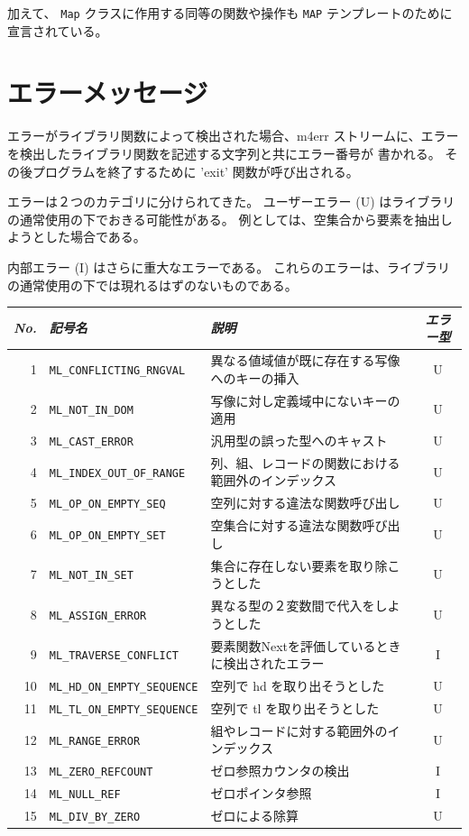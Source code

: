 \documentclass[\pformat,12pt]{jarticle}
\begin{document}
加えて、 {\tt Map} クラスに作用する同等の関数や操作も {\tt MAP} テンプレートのために宣言されている。



\section{エラーメッセージ} \label{error-messages}
エラーがライブラリ関数によって検出された場合、m4err ストリームに、エラーを検出したライブラリ関数を記述する文字列と共にエラー番号が 書かれる。 
その後プログラムを終了するために 'exit' 関数が呼び出される。

エラーは２つのカテゴリに分けられてきた。
ユーザーエラー (U) はライブラリの通常使用の下でおきる可能性がある。
例としては、空集合から要素を抽出しようとした場合である。 

内部エラー (I) はさらに重大なエラーである。 
これらのエラーは、ライブラリの通常使用の下では現れるはずのないものである。

\vspace{0.5cm}
\noindent

\begin{tabular}{|r|l|p{5.5cm}|c|} \hline
{\em No.} & {\em 記号名} & {\em 説明} 
           & {\em エラー型} \\ \hline \hline
1   & {\tt ML\_CONFLICTING\_RNGVAL} & 異なる値域値が既に存在する写像へのキーの挿入&U\\
2   & {\tt ML\_NOT\_IN\_DOM} & 写像に対し定義域中にないキーの適用&U\\
3   & {\tt ML\_CAST\_ERROR} & 汎用型の誤った型へのキャスト&U\\
4   & {\tt ML\_INDEX\_OUT\_OF\_RANGE} & 列、組、レコードの関数における範囲外のインデックス&U\\
5   & {\tt ML\_OP\_ON\_EMPTY\_SEQ} & 空列に対する違法な関数呼び出し&U\\
6   & {\tt ML\_OP\_ON\_EMPTY\_SET} & 空集合に対する違法な関数呼び出し&U\\
7   & {\tt ML\_NOT\_IN\_SET} & 集合に存在しない要素を取り除こうとした&U\\
8   & {\tt ML\_ASSIGN\_ERROR} & 異なる型の２変数間で代入をしようとした&U\\
9   & {\tt ML\_TRAVERSE\_CONFLICT} & 要素関数Nextを評価しているときに検出されたエラー&I\\
10  & {\tt ML\_HD\_ON\_EMPTY\_SEQUENCE} & 空列で hd を取り出そうとした&U\\                      
11  & {\tt ML\_TL\_ON\_EMPTY\_SEQUENCE} & 空列で tl を取り出そうとした&U\\
12  & {\tt ML\_RANGE\_ERROR} & 組やレコードに対する範囲外のインデックス&U\\                                                   
13  & {\tt ML\_ZERO\_REFCOUNT} & ゼロ参照カウンタの検出&I\\
14  & {\tt ML\_NULL\_REF} & ゼロポインタ参照&I\\\hline
15  & {\tt ML\_DIV\_BY\_ZERO} & ゼロによる除算 & U \\ \hline 
\end{tabular}
\end{document}
